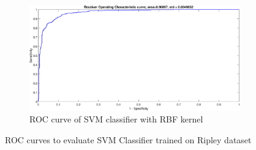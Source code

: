 {\begin{figure}[!ht]
\begin{subfigure}{.35\textwidth}
		\captionsetup{width=0.8\linewidth}
		\includegraphics[height=.65\linewidth, width=0.9\linewidth]{Exercise1/Report/ripley/ripley_RBF_ROC.eps}
		\caption{ROC curve of SVM classifier with RBF kernel} 
		\label{fig:ripley_RBF_ROC}
	\end{subfigure}
	\caption{ROC curves to evaluate SVM Classifier trained on Ripley dataset}
	\label{fig:ripley_ROC}
\end{figure}
}
